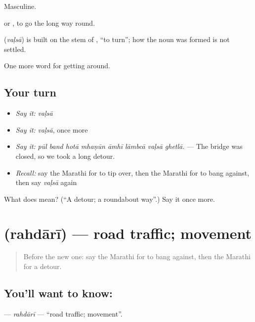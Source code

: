 Masculine.

  or  , to go the long way round.

\begin{cousinweb}
\textbf{} (\emph{vaḷsā}) is built on the stem of \textbf{}, \textquotedblleft{}to turn\textquotedblright{}; how the noun was formed is not settled.
\end{cousinweb}

\begin{grammarlens}[title={What you've built}]
One more word for getting around.
\end{grammarlens}

\subsection*{Your turn}
\begin{itemize}
\raggedright
  \item \emph{Say it:} \emph{vaḷsā}
  \item \emph{Say it:} \emph{vaḷsā}, once more
  \item \emph{Say it:} \emph{pūl band hotā mhaṇūn āmhī lāmbcā vaḷsā ghetlā.} — The bridge was closed, so we took a long detour.
  \item \emph{Recall:} say the Marathi for to tip over, then the Marathi for to bang against, then say \emph{vaḷsā} again
\end{itemize}

\begin{tcolorbox}[breakable,colback=teal!4,colframe=teal!35!black,title={Before you move on}]
What does  mean? (\textquotedblleft{}A detour; a roundabout way\textquotedblright{}.) Say it once more.
\end{tcolorbox}
\section[\texorpdfstring{\mr{रहदारी} (rahdārī)}{रहदारी (rahdārī)}]{ (rahdārī) — road traffic; movement}

\label{lesson:MR-C404-rahdari}



\begin{quote}
Before the new one: say the Marathi for to bang against, then the Marathi for a detour.
\end{quote}

\subsection*{You'll want to know: }
\textbf{} — \emph{rahdārī} — \textquotedblleft{}road traffic; movement\textquotedblright{}.

